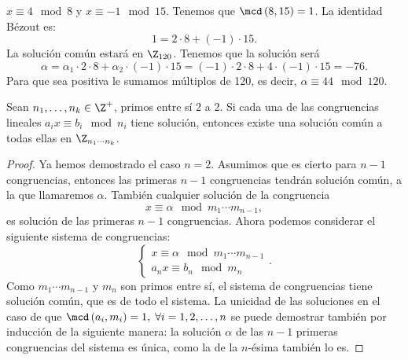 \begin{eg}
\normalfont $\displaystyle x \equiv 4 \mod 8 $ y $\displaystyle x \equiv -1 \mod 15 $. Tenemos que $\displaystyle \mcd\left(8,15\right) = 1 $. La identidad Bézout es:
\[1 = 2 \cdot 8 + \left(-1\right) \cdot 15 .\]
La solución común estará en $\displaystyle \Z_{120} $. Tenemos que la solución será 
\[\alpha = \alpha_{1} \cdot 2 \cdot 8 + \alpha_{2} \cdot \left(-1\right) \cdot 15 = \left(-1\right) \cdot 2 \cdot 8 + 4 \cdot \left(-1\right) \cdot 15 = -76 .\]
Para que sea positiva le sumamos múltiplos de 120, es decir, $\displaystyle \alpha \equiv 44 \mod 120 $.
\end{eg}

\begin{ftheorem}
\normalfont Sean $\displaystyle n_{1}, \ldots, n_{k}\in\Z^{+} $, primos entre sí 2 a 2. Si cada una de las congruencias lineales $\displaystyle a_{i}x \equiv b_{i} \mod n_{i} $ tiene solución, entonces existe una solución común a todas ellas en $\displaystyle \Z_{n_{1} \cdots n_{k}} $.
\end{ftheorem}
\begin{proof}
Ya hemos demostrado el caso $\displaystyle n = 2 $. Asumimos que es cierto para $\displaystyle n-1 $ congruencias, entonces las primeras $\displaystyle n-1 $ congruencias tendrán solución común, a la que llamaremos $\displaystyle \alpha  $. También cualquier solución de la congruencia
\[ x \equiv \alpha \mod m_{1} \cdots m_{n-1} ,\]
es solución de las primeras $\displaystyle n-1 $ congruencias. Ahora podemos considerar el siguiente sistema de congruencias:
\[
\begin{cases}
x \equiv \alpha \mod m_{1}\cdots m_{n-1} \\
a_{n}x \equiv b_{n} \mod m_{n}
\end{cases}
.\]
Como $\displaystyle m_{1} \cdots m_{n-1} $ y $\displaystyle m_{n} $ son primos entre sí, el sistema de congruencias tiene solución común, que es de todo el sistema. La unicidad de las soluciones en el caso de que $\displaystyle \mcd\left(a_{i}, m_{i}\right) = 1, \; \forall i = 1, 2, \ldots, n $ se puede demostrar también por inducción de la siguiente manera: la solución $\displaystyle \alpha  $ de las $\displaystyle n-1 $ primeras congruencias del sistema es única, como la de la $\displaystyle n $-ésima también lo es. 
\end{proof}


